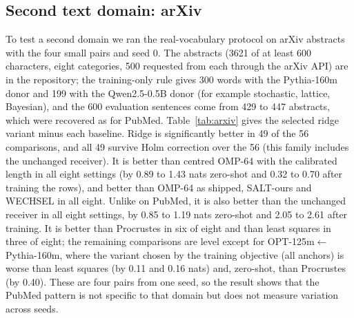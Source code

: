 \documentclass[preprint,12pt]{elsarticle}
\begin{document}
\subsection{Second text domain: arXiv}
\label{sec:arxiv}
To test a second domain we ran the real-vocabulary protocol on arXiv abstracts with the four small pairs and seed 0. The abstracts (3621 of at least 600 characters, eight categories, 500 requested from each through the arXiv API) are in the repository; the training-only rule gives 300 words with the Pythia-160m donor and 199 with the Qwen2.5-0.5B donor (for example stochastic, lattice, Bayesian), and the 600 evaluation sentences come from 429 to 447 abstracts, which were recovered as for PubMed. Table~\ref{tab:arxiv} gives the selected ridge variant minus each baseline. Ridge is significantly better in 49 of the 56 comparisons, and all 49 survive Holm correction over the 56 (this family includes the unchanged receiver). It is better than centred OMP-64 with the calibrated length in all eight settings (by 0.89 to 1.43 nats zero-shot and 0.32 to 0.70 after training the rows), and better than OMP-64 as shipped, SALT-ours and WECHSEL in all eight. Unlike on PubMed, it is also better than the unchanged receiver in all eight settings, by 0.85 to 1.19 nats zero-shot and 2.05 to 2.61 after training. It is better than Procrustes in six of eight and than least squares in three of eight; the remaining comparisons are level except for OPT-125m$\leftarrow$Pythia-160m, where the variant chosen by the training objective (all anchors) is worse than least squares (by 0.11 and 0.16 nats) and, zero-shot, than Procrustes (by 0.40). These are four pairs from one seed, so the result shows that the PubMed pattern is not specific to that domain but does not measure variation across seeds.
\begin{table}[t]
\centering\small
\caption{Selected ridge variant minus each baseline on arXiv abstracts, mean sentence NLL difference in nats (negative = ridge better; seed 0, 600 evaluation sentences per pair). The variant chosen by the training objective is given in brackets (r[freq5000] or r[all]). $^{*}$ the 95\,\% abstract-level bootstrap interval excludes 0; $^{\dagger}$ significant after Holm correction over the 56 comparisons. OMP-64c cal.\ = official OMP-64 on centred inputs with the calibrated length; OMP-64s = as shipped; LS, Procrustes and SALT-ours are our adaptations; Unch.\ = the unchanged receiver.}
\label{tab:arxiv}
\resizebox{\textwidth}{!}{}
\end{table}
\end{document}
